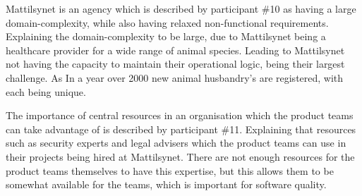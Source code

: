 
Mattilsynet is an agency which is described by participant \#10 as having a large domain-complexity, while also having relaxed non-functional requirements. Explaining the domain-complexity to be large, due to Mattilsynet being a healthcare provider for a wide range of animal species. Leading to Mattilsynet not having the capacity to maintain their operational logic, being their largest challenge. As In a year over 2000 new animal husbandry's are registered, with each being unique.


The importance of central resources in an organisation which the product teams can take advantage of is described by participant \#11. Explaining that resources such as security experts and legal advisers which the product teams can use in their projects being hired at Mattilsynet. There are not enough resources for the product teams themselves to have this expertise, but this allows them to be somewhat available for the teams, which is important for software quality.



